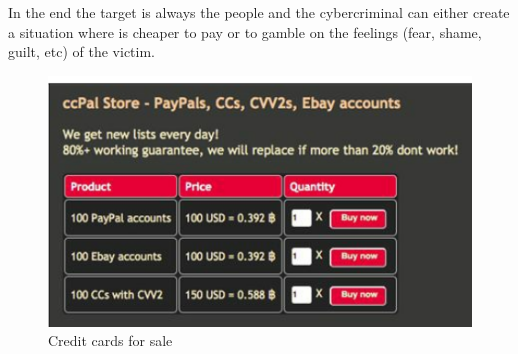 \linej
In the end the target is always the people and the cybercriminal can either create a situation where is cheaper to pay or to gamble on the feelings (fear, shame, guilt, etc) of the victim.
\begin{figure}[H]
	\centering
	\includegraphics[width=.7\textwidth]{figuras/credit_cards_for_sale.png}
	\caption{Credit cards for sale\cite{ransomware_digital_extortion}}
\end{figure}

